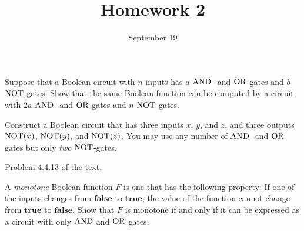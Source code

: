 \documentclass{../math167}
\title{Homework 2}
\date{September 19}
\author{}
\begin{document}
\begin{problems}
\item Suppose that a Boolean circuit with \(n\) inputs has \(a\)
  \(\operatorname{AND}\)- and \(\operatorname{OR}\)-gates and \(b\) \(\operatorname{NOT}\)-gates.  Show that the
  same Boolean function can be computed by a circuit with \(2a\)
  \(\operatorname{AND}\)- and \(\operatorname{OR}\)-gates and \(n\) \(\operatorname{NOT}\)-gates.

  \begin{solution}
  \end{solution}

\item Construct a Boolean circuit that has three inputs \(x\), \(y\),
  and \(z\), and three outputs \(\operatorname{NOT}(x)\), \(\operatorname{NOT}(y)\), and
  \(\operatorname{NOT}(z)\).  You may use any number of \(\operatorname{AND}\)- and \(\operatorname{OR}\)-gates
  but only \emph{two} \(\operatorname{NOT}\)-gates.

  \begin{solution}
  \end{solution}

\item Problem 4.4.13 of the text.
  \begin{book}
    A \emph{monotone} Boolean function \(F\) is one that has the
    following property: If one of the inputs changes from
    \(\mathbf{false}\) to \(\mathbf{true}\), the value of the function
    cannot change from \(\mathbf{true}\) to \(\mathbf{false}\).  Show
    that \(F\) is monotone if and only if it can be expressed as a
    circuit with only \(\operatorname{AND}\) and \(\operatorname{OR}\) gates.
  \end{book}

  \begin{solution}
  \end{solution}

\end{problems}
\end{document}
